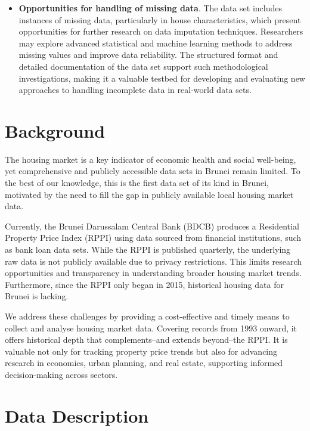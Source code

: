 \documentclass[
  number]{elsarticle}
\providecommand{\tightlist}{%
  \setlength{\itemsep}{0pt}\setlength{\parskip}{0pt}}\usepackage{longtable,booktabs,array}
\begin{document}
\begin{itemize}
\tightlist
\item
  \textbf{Opportunities for handling of missing data}. The data set
  includes instances of missing data, particularly in house
  characteristics, which present opportunities for further research on
  data imputation techniques. Researchers may explore advanced
  statistical and machine learning methods to address missing values and
  improve data reliability. The structured format and detailed
  documentation of the data set support such methodological
  investigations, making it a valuable testbed for developing and
  evaluating new approaches to handling incomplete data in real-world
  data sets.
\end{itemize}

\section{Background}\label{background}

The housing market is a key indicator of economic health and social
well-being, yet comprehensive and publicly accessible data sets in
Brunei remain limited. To the best of our knowledge, this is the first
data set of its kind in Brunei, motivated by the need to fill the gap in
publicly available local housing market data.

Currently, the Brunei Darussalam Central Bank (BDCB) produces a
Residential Property Price Index (RPPI) \citep{bdcb2021technical} using
data sourced from financial institutions, such as bank loan data sets.
While the RPPI is published quarterly, the underlying raw data is not
publicly available due to privacy restrictions. This limits research
opportunities and transparency in understanding broader housing market
trends. Furthermore, since the RPPI only began in 2015, historical
housing data for Brunei is lacking.

We address these challenges by providing a cost-effective and timely
means to collect and analyse housing market data. Covering records from
1993 onward, it offers historical depth that complements--and extends
beyond--the RPPI. It is valuable not only for tracking property price
trends but also for advancing research in economics, urban planning, and
real estate, supporting informed decision-making across sectors.

\section{Data Description}\label{data-description}
\end{document}
